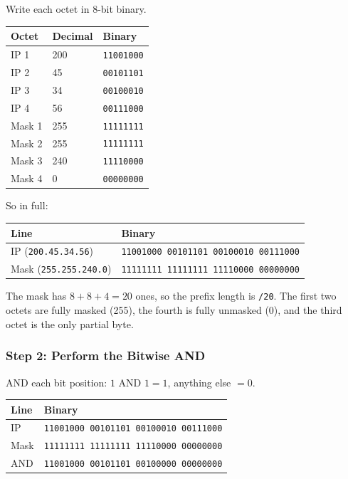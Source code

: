 \documentclass[11pt,a4paper]{article}
\begin{document}
Write each octet in 8-bit binary.

\begin{tabularx}{\textwidth}{@{}lll@{}}
\toprule
\rowcolor{tablehead}\textbf{Octet} & \textbf{Decimal} & \textbf{Binary} \\
\midrule
IP 1 & 200 & \texttt{11001000} \\
IP 2 & 45 & \texttt{00101101} \\
IP 3 & 34 & \texttt{00100010} \\
IP 4 & 56 & \texttt{00111000} \\
\addlinespace
Mask 1 & 255 & \texttt{11111111} \\
Mask 2 & 255 & \texttt{11111111} \\
Mask 3 & 240 & \texttt{11110000} \\
Mask 4 & 0 & \texttt{00000000} \\
\bottomrule
\end{tabularx}

So in full:

\begin{tabularx}{\textwidth}{@{}lX@{}}
\toprule
\rowcolor{tablehead}\textbf{Line} & \textbf{Binary} \\
\midrule
IP (\texttt{200.45.34.56}) & \texttt{11001000 00101101 00100010 00111000} \\
Mask (\texttt{255.255.240.0}) & \texttt{11111111 11111111 11110000 00000000} \\
\bottomrule
\end{tabularx}

The mask has $8 + 8 + 4 = 20$ ones, so the prefix length is \texttt{/20}. The first
two octets are fully masked (255), the fourth is fully unmasked (0), and the third
octet is the only partial byte.

\subsubsection*{Step 2: Perform the Bitwise AND}

AND each bit position: $1$ AND $1 = 1$, anything else $= 0$.

\begin{tabularx}{\textwidth}{@{}lX@{}}
\toprule
\rowcolor{tablehead}\textbf{Line} & \textbf{Binary} \\
\midrule
IP & \texttt{11001000 00101101 00100010 00111000} \\
Mask & \texttt{11111111 11111111 11110000 00000000} \\
AND & \texttt{11001000 00101101 00100000 00000000} \\
\bottomrule
\end{tabularx}
\end{document}
